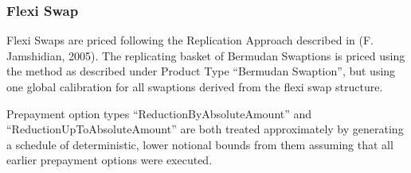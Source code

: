 \subsubsection{Flexi Swap}
\label{pricing:ir_flexiswap}

Flexi Swaps are priced following the Replication Approach described in (F. Jamshidian, 2005). The replicating basket of
Bermudan Swaptions is priced using the method as described under Product Type ``Bermudan Swaption'', but using one
global calibration for all swaptions derived from the flexi swap structure.

Prepayment option types ``ReductionByAbsoluteAmount'' and ``ReductionUpToAbsoluteAmount'' are both treated approximately
by generating a schedule of deterministic, lower notional bounds from them assuming that all earlier prepayment options
were executed.

